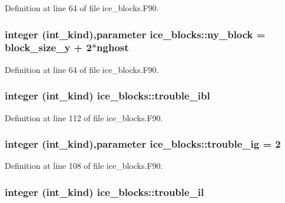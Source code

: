 Definition at line 64 of file ice\_\-blocks.F90.\hypertarget{namespaceice__blocks_a9ad40e7eeb19aeb81a3010e0dd997c43}{
\subsubsection[{ny\_\-block}]{\setlength{\rightskip}{0pt plus 5cm}integer (int\_\-kind),parameter {\bf ice\_\-blocks::ny\_\-block} = block\_\-size\_\-y + 2$\ast${\bf nghost}}}
\label{namespaceice__blocks_a9ad40e7eeb19aeb81a3010e0dd997c43}


Definition at line 64 of file ice\_\-blocks.F90.\hypertarget{namespaceice__blocks_a10098396d200773e0d7ebe723e6226e5}{
\subsubsection[{trouble\_\-ibl}]{\setlength{\rightskip}{0pt plus 5cm}integer (int\_\-kind) {\bf ice\_\-blocks::trouble\_\-ibl}}}
\label{namespaceice__blocks_a10098396d200773e0d7ebe723e6226e5}


Definition at line 112 of file ice\_\-blocks.F90.\hypertarget{namespaceice__blocks_a28a352083c6fc77c5dc4ba8acb9a1eb5}{
\subsubsection[{trouble\_\-ig}]{\setlength{\rightskip}{0pt plus 5cm}integer (int\_\-kind),parameter {\bf ice\_\-blocks::trouble\_\-ig} = 2}}
\label{namespaceice__blocks_a28a352083c6fc77c5dc4ba8acb9a1eb5}


Definition at line 108 of file ice\_\-blocks.F90.\hypertarget{namespaceice__blocks_a8da713bec362fba640a38ca450162cfd}{
\subsubsection[{trouble\_\-il}]{\setlength{\rightskip}{0pt plus 5cm}integer (int\_\-kind) {\bf ice\_\-blocks::trouble\_\-il}}}
\label{namespaceice__blocks_a8da713bec362fba640a38ca450162cfd}


